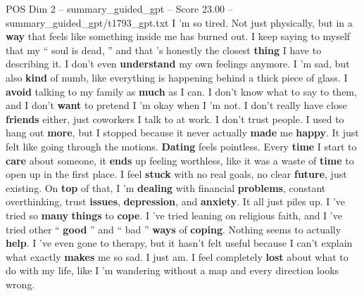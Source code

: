 \begin{textsample}{POS Dim 2 – summary\_guided\_gpt – Score 23.00 – summary\_guided\_gpt/t1793\_gpt.txt}  \label{ex:f2_pos_008}
I ’m so tired.
Not just physically, but in a \textbf{way} that feels like something inside me has burned out.
I keep saying to myself that my “ soul is dead, ” and that ’s honestly the closest \textbf{thing} I have to describing it.
I don't even \textbf{understand} my own feelings anymore.
I ’m sad, but also \textbf{kind} of numb, like everything is happening behind a thick piece of glass.
I \textbf{avoid} talking to my family as \textbf{much} as I can.
I don't know what to say to them, and I don't \textbf{want} to pretend I ’m okay when I ’m not.
I don't really have close \textbf{friends} either, just coworkers I talk to at work.
I don't trust people.
I used to hang out \textbf{more}, but I stopped because it never actually \textbf{made} me \textbf{happy}.
It just felt like going through the motions. \textbf{Dating} feels pointless.
Every \textbf{time} I start to \textbf{care} about someone, it \textbf{ends} up feeling worthless, like it was a waste of \textbf{time} to open up in the first place.
I feel \textbf{stuck} with no real goals, no clear \textbf{future}, just existing.
On \textbf{top} of that, I ’m \textbf{dealing} with financial \textbf{problems}, constant overthinking, trust \textbf{issues}, \textbf{depression}, and \textbf{anxiety}.
It all just piles up.
I ’ve tried so \textbf{many} \textbf{things} to \textbf{cope}.
I ’ve tried leaning on religious faith, and I ’ve tried other “ \textbf{good} ” and “ bad ” \textbf{ways} of \textbf{coping}.
Nothing seems to actually \textbf{help}.
I ’ve even gone to therapy, but it hasn't felt useful because I can't explain what exactly \textbf{makes} me so sad.
I just am.
I feel completely \textbf{lost} about what to do with my life, like I ’m wandering without a map and every direction looks wrong.

\end{textsample}

